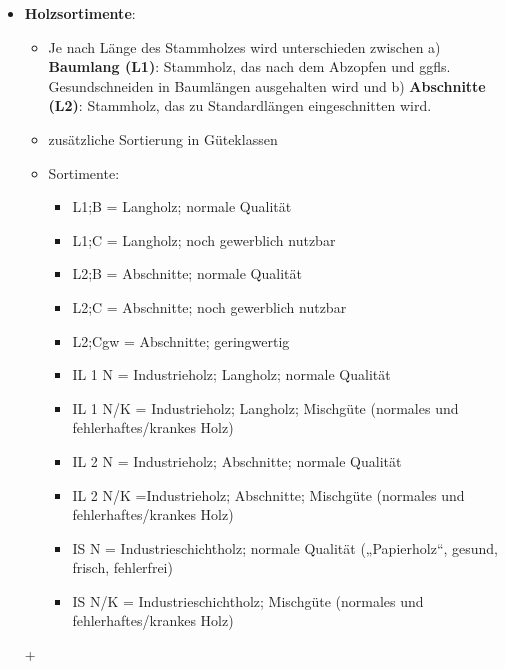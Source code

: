 \documentclass{article}
\begin{document}
\begin{itemize}
\item \textbf{Holzsortimente}:

	\begin{itemize}
		
		\item Je nach Länge des Stammholzes wird unterschieden zwischen a) \textbf{Baumlang (L1)}: Stammholz, das nach dem Abzopfen und ggfls. Gesundschneiden in Baumlängen ausgehalten wird und b) \textbf{Abschnitte (L2)}: Stammholz, das zu Standardlängen eingeschnitten wird.
		
		\item zusätzliche Sortierung in Güteklassen
	
	    \item Sortimente:
	
		\begin{itemize} 
			
			\item L1;B = Langholz; normale Qualität
			\item L1;C = Langholz; noch gewerblich nutzbar
			\item L2;B = Abschnitte; normale Qualität
			\item L2;C = Abschnitte; noch gewerblich nutzbar
			\item L2;Cgw = Abschnitte; geringwertig\\
			
			\item IL 1 N = Industrieholz; Langholz; normale Qualität
			\item IL 1 N/K = Industrieholz; Langholz; Mischgüte (normales und fehlerhaftes/krankes Holz)
			\item IL 2 N = Industrieholz; Abschnitte; normale Qualität
			\item IL 2 N/K =Industrieholz; Abschnitte; Mischgüte (normales und fehlerhaftes/krankes Holz)
			\item IS N = Industrieschichtholz; normale Qualität („Papierholz“, gesund, frisch, fehlerfrei)
			\item IS N/K = Industrieschichtholz; Mischgüte (normales und fehlerhaftes/krankes Holz)
	
		\end{itemize} 
	
	
	\end{itemize}






+


\end{itemize}
\end{document}
